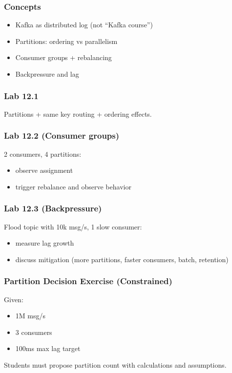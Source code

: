 \documentclass[11pt,a4paper]{article}
\begin{document}
	\subsubsection*{Concepts}
	\begin{itemize}[leftmargin=*]
		\item Kafka as distributed log (not ``Kafka course'')
		\item Partitions: ordering vs parallelism
		\item Consumer groups + rebalancing
		\item Backpressure and lag
	\end{itemize}
	
	\subsubsection*{Lab 12.1}
	Partitions + same key routing + ordering effects.
	
	\subsubsection*{Lab 12.2 (Consumer groups)}
	2 consumers, 4 partitions:
	\begin{itemize}[leftmargin=*]
		\item observe assignment
		\item trigger rebalance and observe behavior
	\end{itemize}
	
	\subsubsection*{Lab 12.3 (Backpressure)}
	Flood topic with 10k msg/s, 1 slow consumer:
	\begin{itemize}[leftmargin=*]
		\item measure lag growth
		\item discuss mitigation (more partitions, faster consumers, batch, retention)
	\end{itemize}
	
	\subsubsection*{Partition Decision Exercise (Constrained)}
	Given:
	\begin{itemize}[leftmargin=*]
		\item 1M msg/s
		\item 3 consumers
		\item 100ms max lag target
	\end{itemize}
	Students must propose partition count with calculations and assumptions.
	
\end{document}
